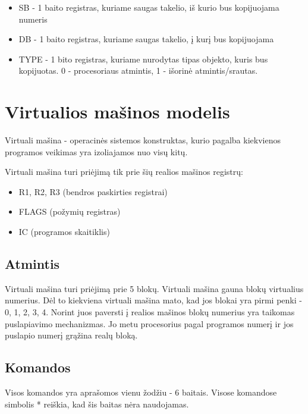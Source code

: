 \documentclass{VUMIFInfKursinis}
\begin{document}
\begin{itemize}
	\item SB - 1 baito registras, kuriame saugas takelio, iš kurio bus kopijuojama numeris
	\item DB - 1 baito registras, kuriame saugas takelio, į kurį bus kopijuojama
	\item TYPE - 1 bito registras, kuriame nurodytas tipas objekto, kuris bus kopijuotas. 0 - procesoriaus atmintis, 1 - išorinė atmintis/srautas.
\end{itemize}

\section{Virtualios mašinos modelis}

Virtuali mašina - operacinės sistemos konstruktas, kurio pagalba kiekvienos programos veikimas yra izoliajamos nuo visų kitų.

Virtuali mašina turi priėjimą tik prie šių realios mašinos registrų:

\begin{itemize}
	\item R1, R2, R3 (bendros paskirties registrai)
	\item FLAGS (požymių registras)
	\item IC (programos skaitiklis)
\end{itemize}

\subsection{Atmintis}

Virtuali mašina turi priėjimą prie 5 blokų. Virtuali mašina gauna blokų virtualius numerius. Dėl to kiekviena virtuali mašina mato, kad jos blokai yra pirmi penki - 0, 1, 2, 3, 4. Norint juos paversti į realios mašinos blokų numerius yra taikomas puslapiavimo mechanizmas. Jo metu procesorius pagal programos numerį ir jos puslapio numerį grąžina realų bloką.

\subsection{Komandos}

Visos komandos yra aprašomos vienu žodžiu - 6 baitais. Visose komandose simbolis * reiškia, kad šis baitas nėra naudojamas.
\end{document}
